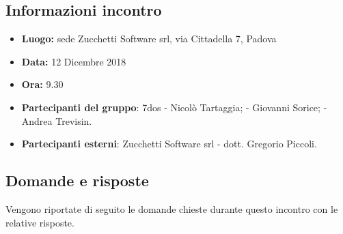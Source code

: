 \subsection{Informazioni incontro}
\begin{itemize}
	\item { \textbf{Luogo:} sede Zucchetti Software srl, via Cittadella 7, Padova}
	\item { \textbf{Data:} 12 Dicembre 2018 }
	\item { \textbf{Ora:} 9.30 }
	\item { \textbf{Partecipanti del gruppo}:  7dos 
		 	\newline - Nicolò Tartaggia; 
		 	\newline - Giovanni Sorice;
		 	\newline - Andrea Trevisin.   		  
	 	 }
	\item { \textbf{Partecipanti esterni}:  Zucchetti Software srl
		 \newline - dott. Gregorio Piccoli.
		 }
\end{itemize}


\subsection{Domande e risposte}
Vengono riportate di seguito le domande chieste durante questo incontro con le relative risposte. 
